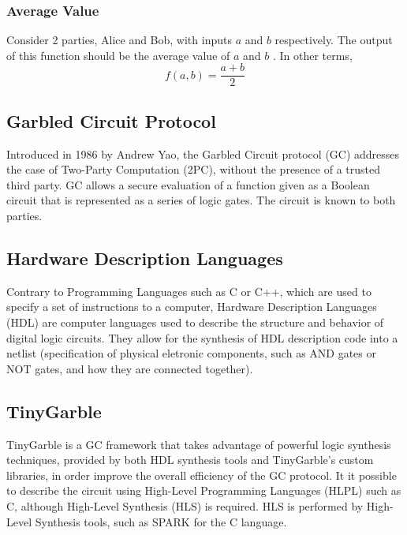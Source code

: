\begin{refsection}




\subsubsection{Average Value}
Consider 2 parties, Alice and Bob, with inputs $a$ and $b$ respectively. The output of this function should be the average value of $a$ and $b$
. In other terms,
\begin{equation}\label{eq:tpc}
f(a,b) = \frac{a+b}{2}
\end{equation}



\subsection{Garbled Circuit Protocol}
Introduced in 1986 by Andrew Yao, the Garbled Circuit protocol (GC) addresses the case
of Two-Party Computation (2PC), without the presence of a trusted third party.
GC allows a secure evaluation of a function given as a Boolean circuit that is represented as a series of logic gates.
The circuit is known to both parties.\\

\subsection{Hardware Description Languages}
Contrary to Programming Languages such as C or C++, which are used to specify a set of instructions to a computer, Hardware Description Languages (HDL) are computer languages used to describe the structure and behavior of digital logic circuits. They allow for the synthesis of HDL description code into a netlist (specification of physical eletronic components, such as AND gates or NOT gates, and how they are connected together).

\subsection{TinyGarble}
TinyGarble is a GC framework that takes advantage of powerful logic synthesis techniques, provided by both HDL synthesis tools
and TinyGarble's custom libraries, in order improve the overall efficiency of the GC protocol.
It it possible to describe the circuit using High-Level Programming Languages (HLPL) such as C, although High-Level Synthesis (HLS) is required. HLS is performed by High-Level Synthesis tools, such as SPARK for the C language.


\end{refsection}
